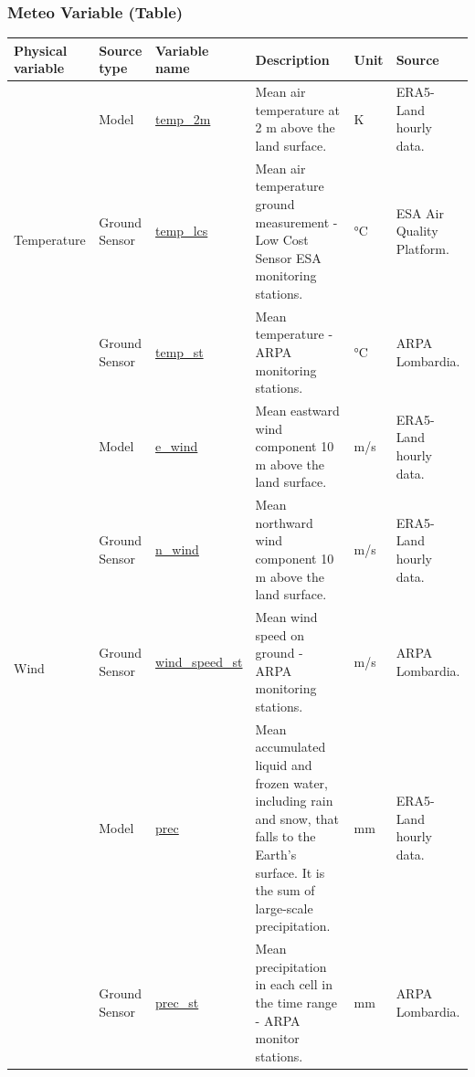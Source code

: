 \subsubsection{Meteo Variable (Table)}
\begin{center}
\setlength{\arrayrulewidth}{1.5pt}

\begin{longtable}{ |p{2.3cm}|p{1.5cm}|p{2.3cm}|p{4cm}|p{1cm}|p{2.3cm}| } 
\hline
\textbf{Physical variable} & \textbf{Source type}  & \textbf{Variable name}  & \textbf{Description}  & \textbf{Unit}  & \textbf{Source}\\ 
\hline
\multirow{3}{4em}{Temperature} & Model  & \underline{temp\_2m} & Mean air temperature at 2 m above the land surface.\par & K & ERA5-Land hourly data.\\ 
& Ground \newline Sensor  & \underline{temp\_lcs} &  Mean air temperature ground measurement - Low Cost Sensor ESA monitoring stations.\par & °C & ESA Air Quality Platform.\\ 
& Ground \newline Sensor  & \underline{temp\_st} &  Mean temperature - ARPA monitoring stations.\par & °C & ARPA \newline Lombardia.\\ \hline

\multirow{4}{4em}{Wind} & Model  & \underline{e\_wind} & Mean eastward wind component 10 m above the land surface.\par & m/s & ERA5-Land hourly data.\\ 
& Ground \newline Sensor  & \underline{n\_wind} &  Mean northward wind component 10 m above the land surface.\par & m/s & ERA5-Land hourly data.\\
& Ground \newline Sensor  & \underline{wind\_speed\_st} &  Mean wind speed on ground  - ARPA monitoring stations. \par& m/s& ARPA \newline Lombardia.\\ \hline
\pagebreak
\hline
\multirow{2}{4em}{Precipitation} & Model  & \underline{prec} & Mean accumulated liquid and frozen water, including rain and snow, that falls to the Earth's surface. It is the sum of large-scale precipitation. \par & mm & ERA5-Land hourly data.\\ 
& Ground \newline Sensor  & \underline{prec\_st} &  Mean precipitation in each cell in the time range - ARPA monitor stations. \par & mm & ARPA \newline Lombardia.\\ \hline


\end{longtable}
\end{center}
